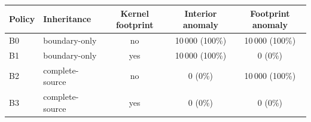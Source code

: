 \begin{tabular}{llccc}
\toprule
Policy & Inheritance & Kernel footprint & Interior anomaly & Footprint anomaly \\
\midrule
B0 & boundary-only & no & 10\,000 (100\%) & 10\,000 (100\%) \\
B1 & boundary-only & yes & 10\,000 (100\%) & 0 (0\%) \\
B2 & complete-source & no & 0 (0\%) & 10\,000 (100\%) \\
B3 & complete-source & yes & 0 (0\%) & 0 (0\%) \\
\bottomrule
\end{tabular}
